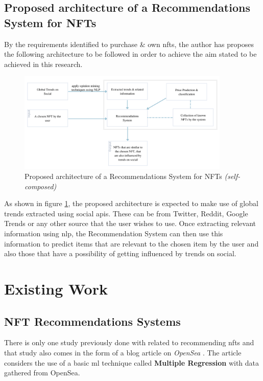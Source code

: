 \subsection{Proposed architecture of a Recommendations System for NFTs}
By the requirements identified to purchase \& own \gls{nft}s, the author has proposes the following architecture to be followed in order to achieve the aim stated to be achieved in this research.

\begin{figure}[h!]
\centering
\includegraphics[width=0.9\textwidth]{images/LR/Proposed Architecture for domain.png}
\caption{Proposed architecture of a Recommendations System for NFTs \textit{(self-composed)}}
\label{fig:proposed-recommendations-architecture}
\end{figure}

As shown in figure \ref{fig:proposed-recommendations-architecture}, the proposed architecture is expected to make use of global trends extracted using social \gls{api}s. These can be from Twitter, Reddit, Google Trends or any other source that the user wishes to use. Once extracting relevant information using \gls{nlp}, the Recommendation System can then use this information to predict items that are relevant to the chosen item by the user and also those that have a possibility of getting influenced by trends on social.



\section{Existing Work}
\subsection{NFT Recommendations Systems}

There is only one study previously done with related to recommending \gls{nft}s and that study also comes in the form of a blog article on \emph{OpenSea} \autocite{noauthor_what_2020}. The article considers the use of a basic \gls{ml} technique called \textbf{Multiple Regression} with data gathered from OpenSea.


